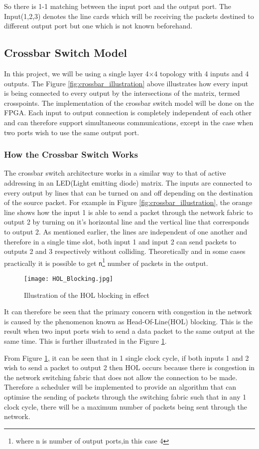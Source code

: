 \documentclass[twoside,12pt,fleqn]{book} %
\begin{document}
So there is 1-1 matching between the input port and the output port. The Input(1,2,3) denotes the line cards which will be receiving the packets destined to different output port but one which is not known beforehand.
\subsection{Crossbar Switch Model}
In this project, we will be using a single layer 4$\times$4 topology with 4 inputs and 4 outputs. The Figure \ref{fig:crossbar_illustration} above illustrates how every input is being connected to every output by the intersections of the matrix, termed crosspoints. The implementation of the crossbar switch model will be done on the FPGA. Each input to output connection is completely independent of each other and can therefore support simultaneous communications, except in the case when two ports wish to use the same output port.
\subsubsection{How the Crossbar Switch Works}
The crossbar switch architecture works in a similar way to that of active addressing in an LED(Light emitting diode) matrix. The inputs are connected to every output by lines that can be turned on and off depending on the destination of the source packet. For example in Figure \ref{fig:crossbar_illustration}, the orange line shows how the input 1 is able to send a packet through the network fabric to output 2 by turning on it's horizontal line and the vertical line that corresponds to output 2. As mentioned earlier, the lines are independent of one another and therefore in a single time slot, both input 1 and input 2 can send packets to outputs 2 and 3 respectively without colliding. Theoretically and in some cases practically it is possible to get \texttt{n}\footnote{where n is number of output ports,in this case 4} number of packets in the output.
\par\vspace{\baselineskip}
\begin{figure}[ht]
    \centering
    \texttt{[image: HOL\_Blocking.jpg]}
    \caption{Illustration of the HOL blocking in effect}
    \label{fig:HOL_Blocking}
\end{figure}
It can therefore be seen that the primary concern with congestion in the network is caused by the phenomenon known as Head-Of-Line(HOL) blocking. This is the result when two input ports wish to send a data packet to the same output at the same time. This is further illustrated in the Figure \ref{fig:HOL_Blocking}.
\par\vspace{\baselineskip}
From Figure \ref{fig:HOL_Blocking}, it can be seen that in 1 single clock cycle, if both inputs 1 and 2 wish to send a packet to output 2 then HOL occurs because there is congestion in the network switching fabric that does not allow the connection to be made. Therefore a scheduler will be implemented to provide an algorithm that can optimise the sending of packets through the switching fabric such that in any 1 clock cycle, there will be a maximum number of packets being sent through the network.
\newpage
\end{document}
